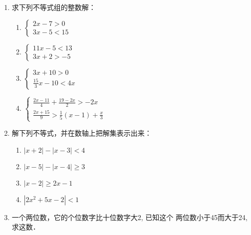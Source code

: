 \begin{enumerate}
\item 求下列不等式组的整数解：
\begin{multicols}{2}
\begin{enumerate}
    \item $\begin{cases}
        2x-7>0\\3x-5<15
    \end{cases}$
    \item $\begin{cases}
        11x-5<13\\3x+2>-5
    \end{cases}$
    \item $\begin{cases}
       3x+10>0\\ \frac{15}{3}x-10<4x
    \end{cases}$
    \item $\begin{cases}
      \frac{2x-11}{4}+\frac{19-2x}{2}>-2x\\
      \frac{2x+15}{9}>\frac{1}{5}(x-1)+\frac{x}{3}
    \end{cases}$
\end{enumerate}
\end{multicols}

\item 解下列不等式，并在数轴上把解集表示出来：
\begin{multicols}{2}
\begin{enumerate}
    \item $|x+2|-|x-3|<4$
    \item $|x-5|-|x-4|\ge 3$
    \item $|x-2|\ge 2x-1$
    \item $|2x^2+5x-2|<1$
\end{enumerate}
\end{multicols}

\item 一个两位数，它的个位数字比十位数字大2, 已知这个
两位数小于45而大于24, 求这数．


\end{enumerate}
